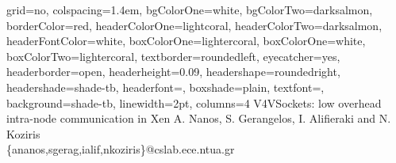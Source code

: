 \documentclass[a0paper,portrait,final]{baposter}
\begin{document}
\newlength{\leftimgwidth}
\begin{poster}%
  {
  grid=no,
  colspacing=1.4em,
  bgColorOne=white,
  bgColorTwo=darksalmon,
  borderColor=red,
  headerColorOne=lightcoral,
  headerColorTwo=darksalmon,
  headerFontColor=white,
  boxColorOne=lightercoral,
  boxColorOne=white,
  boxColorTwo=lightercoral,
  textborder=roundedleft,
  eyecatcher=yes,
  headerborder=open,
  headerheight=0.09\textheight,
  headershape=roundedright,
  headershade=shade-tb,
  headerfont=\Large\textsf, %
  boxshade=plain,
  textfont={\sf },
  background=shade-tb,
  linewidth=2pt,
  columns=4
  }
  {
   }
  {V4VSockets: low overhead intra-node communication in Xen}
  {A. Nanos, S. Gerangelos, I. Alifieraki and N. Koziris\\ \{ananos,sgerag,ialif,nkoziris\}@cslab.ece.ntua.gr}
  {   
   }


\end{poster}
\end{document}
